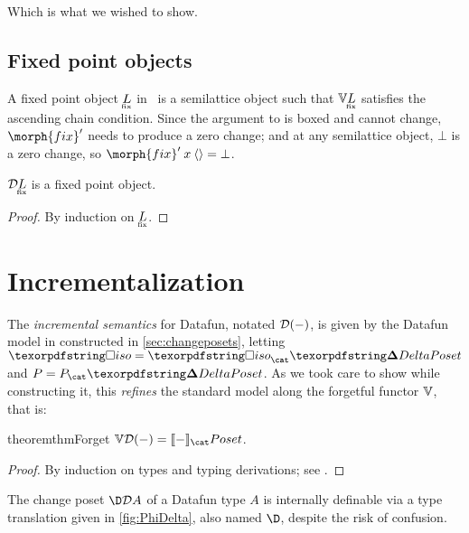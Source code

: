 \documentclass{rntz}\usepackage{fantasy}%
\begin{document}
\nopagebreak%
\noindent
Which is what we wished to show.


\subsection{Fixed point objects}
\label{sec:CP-fix}

A fixed point object $\fixt L$ in \CP\ is a semilattice object such that
$\vals{\fixt L}$ satisfies the ascending chain condition.  Since the argument to  is boxed and cannot change,
$\deriv{\morph{fix}}$ needs to produce a zero change; and at any semilattice
object, $\bot$ is a zero change, so \( \deriv{\morph{fix}} \<x \<\tuple{} = \bot
\).

\begin{lemma}\label{lem:fixobject}
  \(\incdens{\fixt L}\) is a fixed point object.
\end{lemma}
\begin{proof}
  By induction on $\fixt L$. 
\end{proof}


\section{Incrementalization}
\label{sec:incremental}

The \emph{incremental semantics} for Datafun, notated $\mathcal{D}({-})$, is given by
the Datafun model in \CP{} constructed in \cref{sec:changeposets}, letting
$\disco = \iso_\CP$ and $\pfin = \pfin_\CP$. As we took care to show while
constructing it, this \emph{refines} the standard model along the forgetful
functor $\mathbb{V}$, that is:

\begin{restatable}{theorem}{thmForget}
  \label{thm:forget}
  \(\vals{\incden{-}} = \den{-}_\Poset\).
\end{restatable}

\begin{proof}
  By induction on types and typing derivations; see .
\end{proof}

The change poset $\D\incdens A$ of a Datafun type $A$ is internally definable
via a type translation given in \cref{fig:PhiDelta}, also named $\D$, despite
the risk of confusion.
\end{document}
